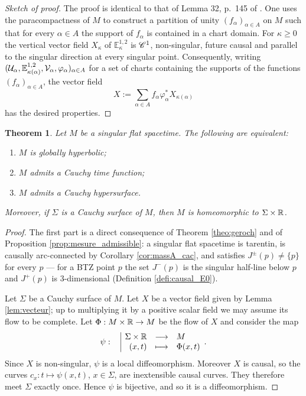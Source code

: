 \documentclass[a4paper,twoside]{article}
\newcommand{\fonction}[5]{\displaystyle#1:\begin{array}{l|rcl}
& \displaystyle #2 & \longrightarrow & \displaystyle #3 \\
    & \displaystyle #4 & \longmapsto & \displaystyle #5 \end{array}}
\newcommand{\mass}[1]{\mathbb{E}^{1,2}_{#1}}
\newtheorem{theo}{Theorem}
\begin{document}
\begin{proof}[Sketch of proof]
The proof is identical to that of Lemma 32, p.~145 of \cite{oneil}.
One uses the paracompactness of $M$ to construct a partition of unity $(f_\alpha)_{\alpha\in A}$
on $M$ such that for every $\alpha\in A$ the support of $f_\alpha$ is contained in a chart domain.
For $\kappa\geq 0$ the vertical vector field $X_\kappa$ of $\mass{\kappa}$ is $\mathscr C^1$, non-singular, future causal
and parallel to the singular direction at every singular point.
Consequently, writing $(\U_\alpha,\mass{\kappa(\alpha)},\V_\alpha,\varphi_\alpha)_{\alpha\in A}$
for a set of charts containing the supports of the functions $(f_\alpha)_{\alpha\in A}$, the vector field
$$X:=\sum_{\alpha\in A} f_{\alpha} \varphi_\alpha^*X_{\kappa(\alpha)}$$
has the desired properties.
\end{proof}

\begin{theo}\label{theo:geroch_sing}
Let $M$ be a singular flat spacetime. The following are equivalent:
\begin{enumerate}[label=(\roman*)]
\item $M$ is globally hyperbolic;
\item $M$ admits a Cauchy time function;
\item $M$ admits a Cauchy hypersurface.
\end{enumerate}
Moreover, if $\Sigma$ is a Cauchy surface of $M$, then $M$ is homeomorphic to $\Sigma\times \mathbb R$.
\end{theo}
\begin{proof}
The first part is a direct consequence of Theorem \ref{theo:geroch} and of Proposition
\ref{prop:mesure_admissible}: a singular flat spacetime is tarentin, is causally arc-connected by
Corollary \ref{cor:massA_cac}, and satisfies $J^\pm(p)\neq \{p\}$ for every $p$ --- for a BTZ point
$p$ the set $J^-(p)$ is the singular half-line below $p$ and $J^+(p)$ is $3$-dimensional
(Definition \ref{defi:causal_E0}).

Let $\Sigma$ be a Cauchy surface of $M$.
Let $X$ be a vector field given by Lemma \ref{lem:vecteur}; up to multiplying it by a positive
scalar field we may assume its flow to be complete. Let $\Phi : M\times \mathbb R \rightarrow M$ be the flow of $X$
and consider the map
$$\fonction{\psi}{\Sigma\times \RR}{M}{(x,t)}{\Phi(x,t)}.$$
Since $X$ is non-singular, $\psi$ is a local diffeomorphism.
Moreover $X$ is causal, so the curves $c_x:t\mapsto \psi(x,t)$, $x\in \Sigma$, are inextensible causal
curves. They therefore meet $\Sigma$ exactly once.
Hence $\psi$ is bijective, and so it is a diffeomorphism.
\end{proof}
\end{document}
